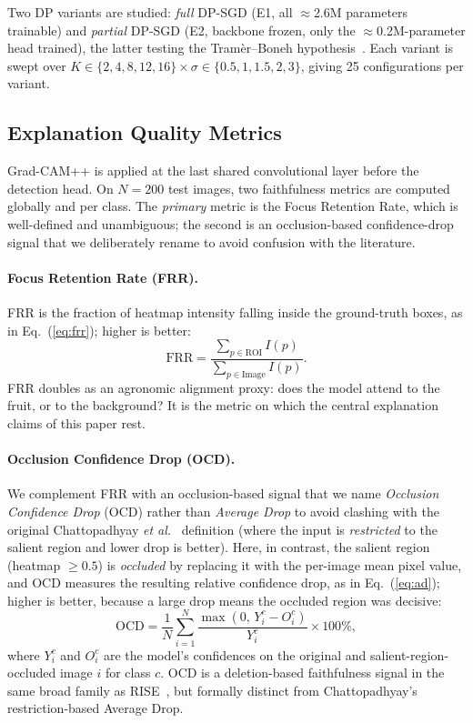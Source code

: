 \documentclass[twocolumn,a4paper,10pt]{article}
\begin{document}
Two DP variants are studied: \emph{full} DP-SGD (E1, all $\approx$2.6M
parameters trainable) and \emph{partial} DP-SGD (E2, backbone frozen, only the
$\approx$0.2M-parameter head trained), the latter testing the Tram\`er--Boneh
hypothesis~\cite{tramer2021}. Each variant is swept over $K \in
\{2,4,8,12,16\} \times \sigma \in \{0.5,1,1.5,2,3\}$, giving 25 configurations
per variant.

\subsection{Explanation Quality Metrics}
Grad-CAM++ is applied at the last shared convolutional layer before the
detection head. On $N = 200$ test images, two faithfulness metrics are
computed globally and per class. The \emph{primary} metric is the Focus
Retention Rate, which is well-defined and unambiguous; the second is an
occlusion-based confidence-drop signal that we deliberately rename to avoid
confusion with the literature.

\paragraph{Focus Retention Rate (FRR).} FRR is the fraction of heatmap
intensity falling inside the ground-truth boxes, as in
Eq.~(\ref{eq:frr}); higher is better:
\begin{equation}
\mathrm{FRR} = \frac{\sum_{p\in \mathrm{ROI}} I(p)}
                    {\sum_{p\in \mathrm{Image}} I(p)}.
\label{eq:frr}
\end{equation}
FRR doubles as an agronomic alignment proxy: does the model attend to the
fruit, or to the background? It is the metric on which the central
explanation claims of this paper rest.

\paragraph{Occlusion Confidence Drop (OCD).} We complement FRR with an
occlusion-based signal that we name \emph{Occlusion Confidence Drop} (OCD)
rather than \emph{Average Drop} to avoid clashing with the original
Chattopadhyay \emph{et al.}~\cite{gradcampp} definition (where the input is
\emph{restricted} to the salient region and lower drop is better). Here, in
contrast, the salient region (heatmap $\geq 0.5$) is \emph{occluded} by
replacing it with the per-image mean pixel value, and OCD measures the
resulting relative confidence drop, as in Eq.~(\ref{eq:ad}); higher is
better, because a large drop means the occluded region was decisive:
\begin{equation}
\mathrm{OCD} = \frac{1}{N}\sum_{i=1}^{N}
\frac{\max(0,\, Y_i^c - O_i^c)}{Y_i^c}\times 100\%,
\label{eq:ad}
\end{equation}
where $Y_i^c$ and $O_i^c$ are the model's confidences on the original and
salient-region-occluded image $i$ for class $c$. OCD is a deletion-based
faithfulness signal in the same broad family as RISE~\cite{rise}, but
formally distinct from Chattopadhyay's restriction-based Average Drop.
\end{document}
